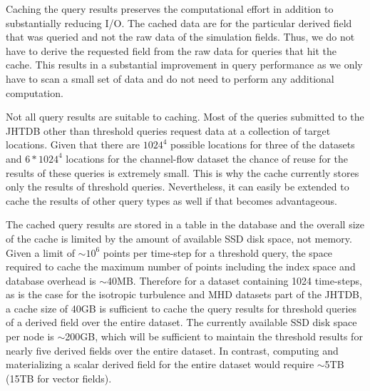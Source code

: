\documentclass{sig-alternate}
\begin{document}
Caching the query results
preserves the computational effort in addition to substantially reducing I/O. The cached data are for the particular derived field that was queried
and not the raw data of the simulation fields.
Thus, we do not have to derive the requested field from the raw data for 
queries that hit the cache. This results in a substantial improvement in query performance as we only have to scan
a small set of data and do not need to perform any additional computation.

Not all query results are suitable to caching. Most of the queries submitted to the JHTDB other than threshold queries request data at a collection of target
locations. Given that there are $1024^4$ possible locations for three of the datasets and $6*1024^4$ locations for the channel-flow dataset the chance of
reuse for the results of these queries is extremely small. This is why the cache currently stores only the results of threshold queries. Nevertheless, it can 
easily be extended to cache the results of other query types as well if that becomes advantageous.

The cached query results are stored in a table in the database and the overall size of the cache is limited by the amount of available SSD disk space, not memory.
Given a limit of $\sim$$10^6$ points per time-step for a threshold query, the space required to cache the maximum number of points including the index
space and database overhead is $\sim$40MB. 
Therefore for a dataset containing 
1024 time-steps, as is the case for the isotropic turbulence and MHD datasets part of the JHTDB, a cache size of 40GB is sufficient to cache the query
results for threshold queries of a derived field over the entire dataset. The currently available SSD disk space per node is $\sim$200GB, which will
be sufficient to maintain the threshold results for nearly five derived fields over the entire dataset. 
In contrast, computing and materializing a scalar derived field for the entire dataset would
require $\sim$5TB (15TB for vector fields).
\end{document}

